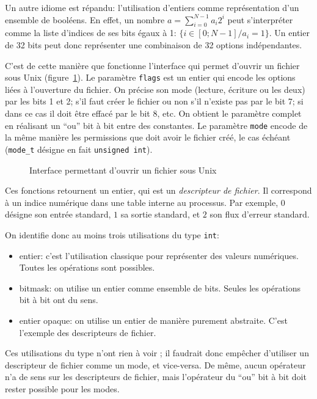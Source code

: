 Un autre idiome est répandu: l'utilisation d'entiers comme représentation d'un
ensemble de booléens. En effet, un nombre $a = \sum_{i=0}^{N-1} a_i 2^i$ peut
s'interpréter comme la liste d'indices de ses bits égaux à 1: $\{ i ∈ [0;N-1] /
a_i = 1 \}$. Un entier de 32 bits peut donc représenter une combinaison de
32 options indépendantes.

C'est de cette manière que fonctionne l'interface qui permet d'ouvrir un fichier
sous Unix (figure~\ref{fig:unix-open}). Le paramètre \texttt{flags} est un
entier qui encode les options liées à l'ouverture du fichier. On précise son
mode (lecture, écriture ou les deux) par les bits 1 et 2; s'il faut créer le
fichier ou non s'il n'existe pas par le bit 7; si dans ce cas il doit être
effacé par le bit 8, etc. On obtient le paramètre complet en réalisant un
\enquote{ou} bit à bit entre des constantes. Le paramètre \texttt{mode} encode
de la même manière les permissions que doit avoir le fichier créé, le cas
échéant (\texttt{mode\_t} désigne en fait \texttt{unsigned int}).

\begin{figure}[h]
    \caption{Interface permettant d'ouvrir un fichier sous Unix}
    \label{fig:unix-open}
\end{figure}

Ces fonctions retournent un entier, qui est un \emph{descripteur de fichier}. Il
correspond à un indice numérique dans une table interne au processus. Par
exemple, $0$ désigne son entrée standard, $1$ sa sortie standard, et $2$ son
flux d'erreur standard.

On identifie donc au moins trois utilisations du type \texttt{int}:

\begin{itemize}
    \item entier: c'est l'utilisation classique pour représenter des valeurs
        numériques. Toutes les opérations sont possibles.
    \item bitmask: on utilise un entier comme ensemble de bits. Seules les
        opérations bit à bit ont du sens.
    \item entier opaque: on utilise un entier de manière purement abstraite.
        C'est l'exemple des descripteurs de fichier.
\end{itemize}

Ces utilisations du type n'ont rien à voir ; il faudrait donc empêcher
d'utiliser un descripteur de fichier comme un mode, et vice-versa. De même,
aucun opérateur n'a de sens sur les descripteurs de fichier, mais l'opérateur
\texttt{\textbar{}} du \enquote{ou} bit à bit doit rester possible pour les
modes.

